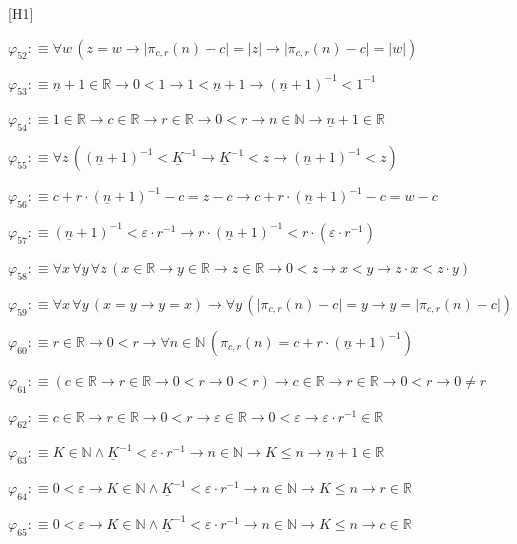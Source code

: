 \begin{fullproof}{[H1]}
\begin{abbrevlist}
\item $\varphi_{52} :\equiv \forall w\,(z = w \to \lvert \pi_{c,r}(n) - c \rvert = \lvert z \rvert \to \lvert \pi_{c,r}(n) - c \rvert = \lvert w \rvert)$
\item $\varphi_{53} :\equiv \underline{n} + 1 \in \mathbb{R} \to 0 < 1 \to 1 < \underline{n} + 1 \to (\underline{n} + 1)^{-1} < 1^{-1}$
\item $\varphi_{54} :\equiv 1 \in \mathbb{R} \to c \in \mathbb{R} \to r \in \mathbb{R} \to 0 < r \to n \in \mathbb{N} \to \underline{n} + 1 \in \mathbb{R}$
\item $\varphi_{55} :\equiv \forall z\,((\underline{n} + 1)^{-1} < \underline{K}^{-1} \to \underline{K}^{-1} < z \to (\underline{n} + 1)^{-1} < z)$
\item $\varphi_{56} :\equiv c + r \cdot (\underline{n} + 1)^{-1} - c = z - c \to c + r \cdot (\underline{n} + 1)^{-1} - c = w - c$
\item $\varphi_{57} :\equiv (\underline{n} + 1)^{-1} < \varepsilon \cdot r^{-1} \to r \cdot (\underline{n} + 1)^{-1} < r \cdot (\varepsilon \cdot r^{-1})$
\item $\varphi_{58} :\equiv \forall x\,\forall y\,\forall z\,(x \in \mathbb{R} \to y \in \mathbb{R} \to z \in \mathbb{R} \to 0 < z \to x < y \to z \cdot x < z \cdot y)$
\item $\varphi_{59} :\equiv \forall x\,\forall y\,(x = y \to y = x) \to \forall y\,(\lvert \pi_{c,r}(n) - c \rvert = y \to y = \lvert \pi_{c,r}(n) - c \rvert)$
\item $\varphi_{60} :\equiv r \in \mathbb{R} \to 0 < r \to \forall n \in \mathbb{N}\,(\pi_{c,r}(n) = c + r \cdot (\underline{n} + 1)^{-1})$
\item $\varphi_{61} :\equiv (c \in \mathbb{R} \to r \in \mathbb{R} \to 0 < r \to 0 < r) \to c \in \mathbb{R} \to r \in \mathbb{R} \to 0 < r \to 0 \neq r$
\item $\varphi_{62} :\equiv c \in \mathbb{R} \to r \in \mathbb{R} \to 0 < r \to \varepsilon \in \mathbb{R} \to 0 < \varepsilon \to \varepsilon \cdot r^{-1} \in \mathbb{R}$
\item $\varphi_{63} :\equiv K \in \mathbb{N} \land \underline{K}^{-1} < \varepsilon \cdot r^{-1} \to n \in \mathbb{N} \to K \leq n \to \underline{n} + 1 \in \mathbb{R}$
\item $\varphi_{64} :\equiv 0 < \varepsilon \to K \in \mathbb{N} \land \underline{K}^{-1} < \varepsilon \cdot r^{-1} \to n \in \mathbb{N} \to K \leq n \to r \in \mathbb{R}$
\item $\varphi_{65} :\equiv 0 < \varepsilon \to K \in \mathbb{N} \land \underline{K}^{-1} < \varepsilon \cdot r^{-1} \to n \in \mathbb{N} \to K \leq n \to c \in \mathbb{R}$

\end{abbrevlist}
\end{fullproof}
